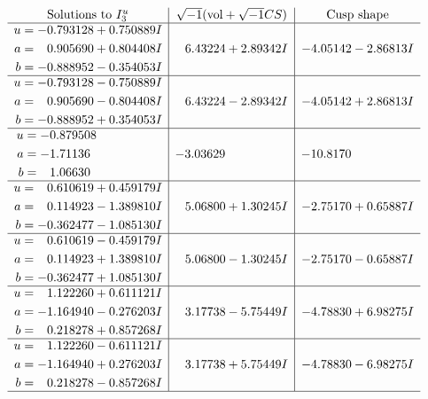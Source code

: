 \documentclass[1p]{elsarticle_modified}
\theoremstyle{definition}
\newcommand{\I}{\sqrt{-1}}
\begin{document}
$$\begin{array}{c|c|c}  
\text{Solutions to }I^u_{3}& \I (\text{vol} + \sqrt{-1}CS) & \text{Cusp shape}\\
 \hline 
\begin{aligned}
u &= -0.793128 + 0.750889 I \\
a &= \phantom{-}0.905690 + 0.804408 I \\
b &= -0.888952 - 0.354053 I\end{aligned}
 & \phantom{-}6.43224 + 2.89342 I & -4.05142 - 2.86813 I \\ \hline\begin{aligned}
u &= -0.793128 - 0.750889 I \\
a &= \phantom{-}0.905690 - 0.804408 I \\
b &= -0.888952 + 0.354053 I\end{aligned}
 & \phantom{-}6.43224 - 2.89342 I & -4.05142 + 2.86813 I \\ \hline\begin{aligned}
u &= -0.879508\phantom{ +0.000000I} \\
a &= -1.71136\phantom{ +0.000000I} \\
b &= \phantom{-}1.06630\phantom{ +0.000000I}\end{aligned}
 & -3.03629\phantom{ +0.000000I} & -10.8170\phantom{ +0.000000I} \\ \hline\begin{aligned}
u &= \phantom{-}0.610619 + 0.459179 I \\
a &= \phantom{-}0.114923 - 1.389810 I \\
b &= -0.362477 - 1.085130 I\end{aligned}
 & \phantom{-}5.06800 + 1.30245 I & -2.75170 + 0.65887 I \\ \hline\begin{aligned}
u &= \phantom{-}0.610619 - 0.459179 I \\
a &= \phantom{-}0.114923 + 1.389810 I \\
b &= -0.362477 + 1.085130 I\end{aligned}
 & \phantom{-}5.06800 - 1.30245 I & -2.75170 - 0.65887 I \\ \hline\begin{aligned}
u &= \phantom{-}1.122260 + 0.611121 I \\
a &= -1.164940 - 0.276203 I \\
b &= \phantom{-}0.218278 + 0.857268 I\end{aligned}
 & \phantom{-}3.17738 - 5.75449 I & -4.78830 + 6.98275 I \\ \hline\begin{aligned}
u &= \phantom{-}1.122260 - 0.611121 I \\
a &= -1.164940 + 0.276203 I \\
b &= \phantom{-}0.218278 - 0.857268 I\end{aligned}
 & \phantom{-}3.17738 + 5.75449 I & -4.78830 - 6.98275 I\\
 \hline 
 \end{array}$$\newpage
\end{document}

